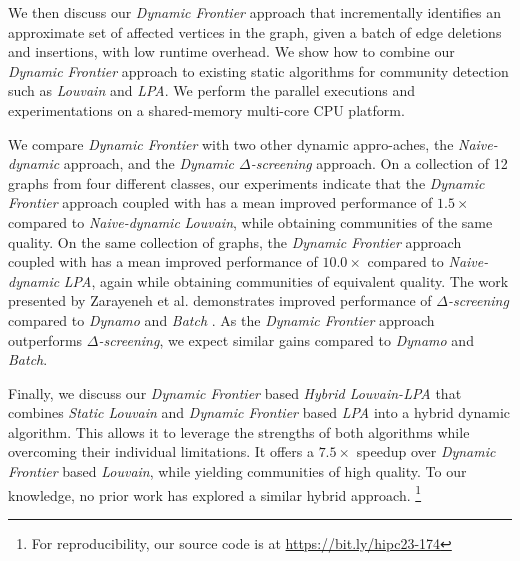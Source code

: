 We then discuss our \textit{Dynamic Frontier} approach that incrementally identifies an approximate set of affected vertices in the graph, given a batch of edge deletions and insertions, with low runtime overhead. We show how to combine our \textit{Dynamic Frontier} approach to existing static algorithms for community detection such as \textit{Louvain} and \textit{LPA}. We perform the parallel executions and experimentations on a shared-memory multi-core CPU platform.

We compare \textit{Dynamic Frontier} with two other dynamic appro-aches, the \textit{Naive-dynamic} approach, and the \textit{Dynamic $\Delta$-screening} approach. On a collection of 12 graphs from four different classes, our experiments indicate that the \textit{Dynamic Frontier} approach coupled with \Lou{} has a mean improved performance of $1.5\times$ compared to \textit{Naive-dynamic} \textit{Louvain}, while obtaining communities of the same quality. On the same collection of graphs, the \textit{Dynamic Frontier} approach coupled with \LPA{} has a mean improved performance of $10.0\times$ compared to \textit{Naive-dynamic} \textit{LPA}, again while obtaining communities of equivalent quality. The work presented by Zarayeneh et al. \cite{com-zarayeneh21} demonstrates improved performance of \textit{$\Delta$-screening} compared to \textit{Dynamo} \cite{com-zhuang19} and \textit{Batch} \cite{com-chong13}. As the \textit{Dynamic Frontier} approach outperforms \textit{$\Delta$-screening}, we expect similar gains compared to \textit{Dynamo} and \textit{Batch}.

Finally, we discuss our \textit{Dynamic Frontier} based \textit{Hybrid Louvain-LPA} that combines \textit{Static Louvain} and \textit{Dynamic Frontier} based \textit{LPA} into a hybrid dynamic algorithm. This allows it to leverage the strengths of both algorithms while overcoming their individual limitations. It offers a $7.5\times$ speedup over \textit{Dynamic Frontier} based \textit{Louvain}, while yielding communities of high quality. To our knowledge, no prior work has explored a similar hybrid approach. \footnote{For reproducibility, our source code is at \url{https://bit.ly/hipc23-174}}




